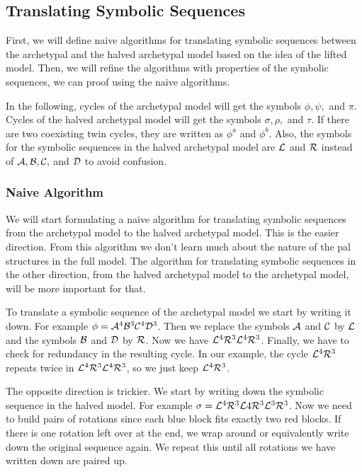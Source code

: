 \subsection{Translating Symbolic Sequences}
\label{sec:add.halved.tanslating}

First, we will define naive algorithms for translating symbolic sequences between the archetypal and the halved archetypal model based on the idea of the lifted model.
Then, we will refine the algorithms with properties of the symbolic sequences, we can proof using the naive algorithms.

In the following, cycles of the archetypal model will get the symbols $\phi, \psi,$ and $\pi$.
Cycles of the halved archetypal model will get the symbols $\sigma, \rho,$ and $\tau$.
If there are two coexisting twin cycles, they are written as $\phi^a$ and $\phi^b$.
Also, the symbols for the symbolic sequences in the halved archetypal model are $\mathcal{L}$ and $\mathcal{R}$ instead of $\mathcal{A}, \mathcal{B}, \mathcal{C},$ and $\mathcal{D}$ to avoid confusion.

\subsubsection{Naive Algorithm}

We will start formulating a naive algorithm for translating symbolic sequences from the archetypal model to the halved archetypal model.
This is the easier direction.
From this algorithm we don't learn much about the nature of the \gls{pal} structures in the full model.
The algorithm for translating symbolic sequences in the other direction, from the halved archetypal model to the archetypal model, will be more important for that.

To translate a symbolic sequence of the archetypal model we start by writing it down.
For example $\phi = \mathcal{A}^4\mathcal{B}^3\mathcal{C}^4\mathcal{D}^3$.
Then we replace the symbols $\mathcal{A}$ and $\mathcal{C}$ by $\mathcal{L}$ and the symbols $\mathcal{B}$ and $\mathcal{D}$ by $\mathcal{R}$.
Now we have $\mathcal{L}^4\mathcal{R}^3\mathcal{L}^4\mathcal{R}^3$.
Finally, we have to check for redundancy in the resulting cycle.
In our example, the cycle $\mathcal{L}^4\mathcal{R}^3$ repeats twice in $\mathcal{L}^4\mathcal{R}^3\mathcal{L}^4\mathcal{R}^3$, so we just keep $\mathcal{L}^4\mathcal{R}^3$.

The opposite direction is trickier.
We start by writing down the symbolic sequence in the halved model.
For example $\sigma = \mathcal{L}^4\mathcal{R}^3\mathcal{L}4\mathcal{R}^3\mathcal{L}^3\mathcal{R}^3$.
Now we need to build pairs of rotations since each blue block fits exactly two red blocks.
If there is one rotation left over at the end, we wrap around or equivalently write down the original sequence again.
We repeat this until all rotations we have written down are paired up.

